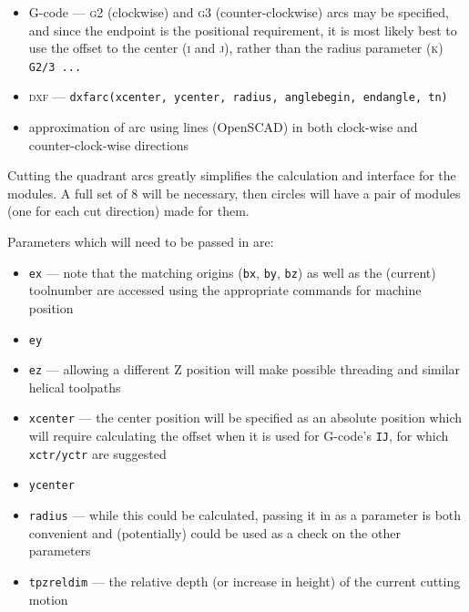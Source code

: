 \documentclass{ltxdoc}
\begin{document}
\begin{itemize}
\item G-code --- \textsc{g2} (clockwise) and \textsc{g3} (counter-clockwise) arcs may be specified, 
      and since the endpoint is the positional requirement, it is most likely best to use the offset 
      to the center (\textsc{i} and \textsc{j}), rather than the radius parameter (\textsc{k}) 
      \texttt{G2/3 ...} 
\item \textsc{dxf} --- \texttt{dxfarc(xcenter, ycenter, radius, anglebegin, endangle, tn)}
\item approximation of arc using lines (OpenSCAD) in both clock-wise and counter-clock-wise directions
\end{itemize}
 
Cutting the quadrant arcs greatly simplifies the calculation and interface for the modules. A full set of 8 will be necessary, then circles will have a pair of modules (one for each cut direction) made for them.
 

Parameters which will need to be passed in are:
 
\begin{itemize}
 \item \texttt{ex} --- note that the matching origins (\verb|bx|, \verb|by|, \verb|bz|) as well as 
                       the (current) toolnumber are accessed using the appropriate commands for machine position
 \item \texttt{ey}
 \item \texttt{ez} --- allowing a different Z position will make possible threading and
                       similar helical toolpaths
\item \texttt{xcenter} --- the center position will be specified as an absolute
      position which will require calculating the offset when it is used for 
      G-code's \texttt{IJ}, for which \texttt{xctr/yctr} are suggested 
\item \texttt{ycenter}
\item \texttt{radius} --- while this could be calculated, passing it in as a parameter
      is both convenient and (potentially) could be used as a check on the other
      parameters
\item \texttt{tpzreldim} --- the relative depth (or increase in height) of the
      current cutting motion
\end{itemize}
\end{document}
